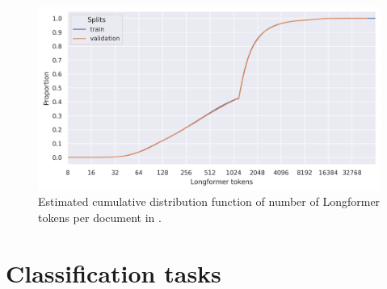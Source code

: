 \begin{figure}
    \includegraphics[width=\textwidth]{./img/train_data_ecdf.png}

    \caption{Estimated cumulative distribution function of number of Longformer
    tokens per document in .}

    \label{fig:train_data_ecdf}
\end{figure}









\section{Classification tasks}

